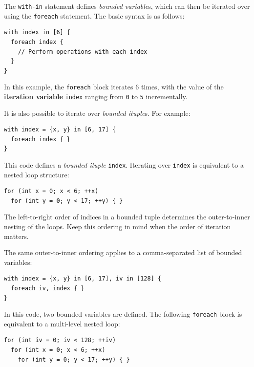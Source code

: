 The \texttt{with-in} statement defines \emph{bounded variable}s, which can then be iterated over using the \texttt{foreach} statement. The basic syntax is as follows:

\begin{lstlisting}[language=croqtile,caption={Indexing one shape}]
with index in [6] {
  foreach index {
    // Perform operations with each index
  }
}
\end{lstlisting}

In this example, the \texttt{foreach} block iterates 6 times, with the value of the \textbf{iteration variable} \texttt{index} ranging from \texttt{0} to \texttt{5} incrementally.

It is also possible to iterate over \emph{bounded ituple}s. For example:

\begin{lstlisting}[language=croqtile,caption={A tuple of indices}]
with index = {x, y} in [6, 17] {
  foreach index { }
}
\end{lstlisting}

This code defines a \emph{bounded ituple} \texttt{index}. Iterating over \texttt{index} is equivalent to a nested loop structure:

\begin{lstlisting}[language={},caption={The generated C++ loop}]
for (int x = 0; x < 6; ++x)
  for (int y = 0; y < 17; ++y) { }
\end{lstlisting}

The left-to-right order of indices in a bounded tuple determines the outer-to-inner nesting of the loops. Keep this ordering in mind when the order of iteration matters.

The same outer-to-inner ordering applies to a comma-separated list of bounded variables:

\begin{lstlisting}[language=croqtile,caption={Several bounded groups}]
with index = {x, y} in [6, 17], iv in [128] {
  foreach iv, index { }
}
\end{lstlisting}

In this code, two bounded variables are defined. The following \texttt{foreach} block is equivalent to a multi-level nested loop:

\begin{lstlisting}[language={},caption={The generated inner loop}]
for (int iv = 0; iv < 128; ++iv)
  for (int x = 0; x < 6; ++x)
    for (int y = 0; y < 17; ++y) { }
\end{lstlisting}
